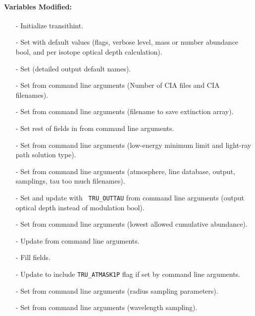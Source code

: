 \documentclass[letterpaper,12pt]{article}
\begin{document}
\paragraph{Variables Modified:}
\begin{enumerate}[leftmargin=10pt, noitemsep, parsep=0pt, topsep=0ex]
\item[-] Initialize  transithint.
\item[-] Set  with
  default values (flags, verbose level, mass or number abundance bool,
  and per isotope optical depth calculation).
\item[-] Set 
  (detailed output default names).
\item[-] Set  from command line
  arguments (Number of CIA files and CIA filenames).
\item[-] Set  from command line arguments
  (filename to save extinction array).
\item[-] Set rest of fields in 
  from command line arguments.
\item[-] Set  from command line
  arguments (low-energy minimum limit and light-ray path solution
  type).
\item[-] Set  from command line arguments (atmosphere, line
  database, output, samplings, tau too much filenames).
\item[-] Set  and update  with {\tt
    TRU\_OUTTAU} from command line arguments (output optical depth
  instead of modulation bool).
\item[-] Set  from command line arguments
  (lowest allowed cumulative abundance).
\item[-] Update  from command line arguments.
\item[-] Fill  fields.
\item[-] Update  to include {\tt TRU\_ATMASK1P} flag
  if set by command line arguments.
\item[-] Set  from
  command line arguments (radius sampling parameters).
\item[-] Set  from command line arguments (wavelength sampling).

\end{enumerate}
\end{document}
